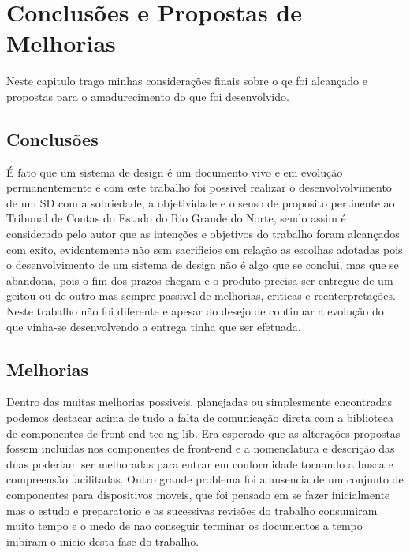 \chapter[Capítulo 5]{Conclusões e Propostas de Melhorias}
\label{ch:cap5}

  Neste capitulo trago minhas considerações finais sobre o qe foi alcançado e propostas para o amadurecimento do que foi desenvolvido.

\section{Conclusões}\label{cap5:conclusao}

  É fato que um sistema de design é um documento vivo e em evolução permanentemente e com este trabalho foi possivel realizar o desenvolvolvimento de um SD com a sobriedade, a objetividade e o senso de proposito pertinente ao Tribunal de Contas do Estado do Rio Grande do Norte, sendo assim é considerado pelo autor que as intenções e objetivos do trabalho foram alcançados com exito, evidentemente não sem sacrificios em relação as escolhas adotadas pois o desenvolvimento de um sistema de design não é algo que se conclui, mas que se abandona, pois o fim dos prazos chegam e o produto precisa ser entregue de um geitou ou de outro mas sempre passivel de melhorias, criticas e reenterpretações. Neste trabalho não foi diferente e apesar do desejo de continuar a evolução do que vinha-se desenvolvendo a entrega tinha que ser efetuada.

\section{Melhorias}\label{cap5:melhorias}

  Dentro das muitas melhorias possiveis, planejadas ou simplesmente encontradas podemos destacar acima de tudo a falta de comunicação direta com a biblioteca de componentes de front-end tce-ng-lib. Era esperado que as alterações propostas fossem incluidas nos componentes de front-end e a nomenclatura e descrição das duas poderiam ser melhoradas para entrar em conformidade tornando a busca e compreensão facilitadas. Outro grande problema foi a ausencia de um conjunto de componentes para dispositivos moveis, que foi pensado em se fazer inicialmente mas o estudo e preparatorio e as sucessivas revisões do trabalho consumiram muito tempo e o medo de nao conseguir terminar os documentos a tempo inibiram o inicio desta fase do trabalho.



